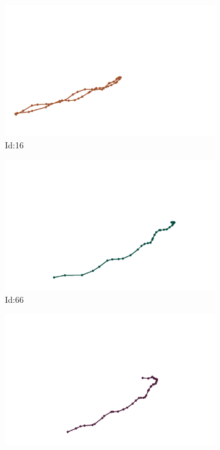 \documentclass[12pt,twoside]{report}
\begin{document}
\begin{figure}
\centering
\begin{subfigure}[b]{0.20\textwidth}
\centering
\includegraphics[width=\textwidth]{../trajectories/16.png}
\caption{Id:16}
\end{subfigure}
\begin{subfigure}[b]{0.20\textwidth}
\centering
\includegraphics[width=\textwidth]{../trajectories/66.png}
\caption{Id:66}
\end{subfigure}
\begin{subfigure}[b]{0.20\textwidth}
\centering
\includegraphics[width=\textwidth]{../trajectories/78.png}

\end{subfigure}
\end{figure}
\end{document}
